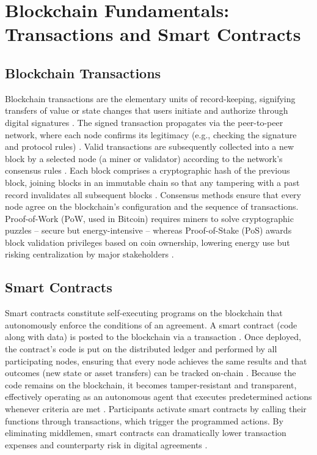 \documentclass[a4paper,10pt]{report}
\begin{document}
\section{Blockchain Fundamentals: Transactions and Smart Contracts}
\subsection{Blockchain Transactions}
Blockchain transactions are the elementary units of record-keeping, signifying transfers of value or state changes that users initiate and authorize through digital signatures \cite{yaga2018nist}. The signed transaction propagates via the peer-to-peer network, where each node confirms its legitimacy (e.g., checking the signature and protocol rules) \cite{christidis2016iot}. Valid transactions are subsequently collected into a new block by a selected node (a miner or validator) according to the network’s consensus rules \cite{christidis2016iot}. Each block comprises a cryptographic hash of the previous block, joining blocks in an immutable chain so that any tampering with a past record invalidates all subsequent blocks \cite{yaga2018nist}. Consensus methods ensure that every node agree on the blockchain’s configuration and the sequence of transactions. Proof-of-Work (PoW, used in Bitcoin) requires miners to solve cryptographic puzzles – secure but energy-intensive – whereas Proof-of-Stake (PoS) awards block validation privileges based on coin ownership, lowering energy use but risking centralization by major stakeholders \cite{hussein2023consensus}.

\subsection{Smart Contracts}

Smart contracts constitute self-executing programs on the blockchain that autonomously enforce the conditions of an agreement. A smart contract (code along with data) is posted to the blockchain via a transaction \cite{yaga2018nist}. Once deployed, the contract’s code is put on the distributed ledger and performed by all participating nodes, ensuring that every node achieves the same results and that outcomes (new state or asset transfers) can be tracked on-chain \cite{yaga2018nist}. Because the code remains on the blockchain, it becomes tamper-resistant and transparent, effectively operating as an autonomous agent that executes predetermined actions whenever criteria are met \cite{yaga2018nist}. Participants activate smart contracts by calling their functions through transactions, which trigger the programmed actions. By eliminating middlemen, smart contracts can dramatically lower transaction expenses and counterparty risk in digital agreements \cite{yaga2018nist}.
\end{document}
